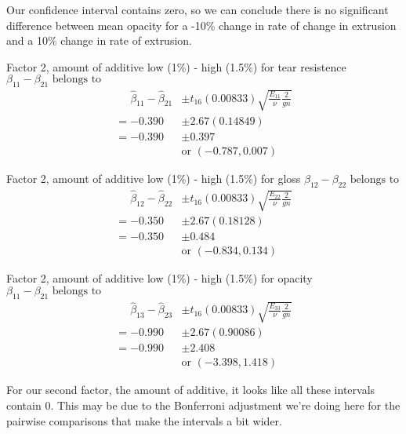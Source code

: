 \begin{enumerate}[label= (\alph*)]
    Our confidence interval contains zero, so we can conclude there is no significant difference between mean opacity for a -10\% change in rate of change in extrusion and a 10\% change in rate of extrusion.


    Factor 2, amount of additive low (1\%) - high (1.5\%) for tear resistence \newline
    $\beta_{11} - \beta_{21}\text{ belongs to}$
    \begin{align*}
        \phantom{=}
        \hat{\beta}_{11} - \hat{\beta}_{21}
        & \pm
        t_{16}(0.00833)
        \sqrt{\frac{E_{11}}{\nu}\frac{2}{gn}}
        \\
        =
        -0.390
        & \pm
        2.67(0.14849)
        \\
        =
        -0.390
        & \pm
        0.397
        \\
        \phantom{\pm 0.590}
        &
        \text{or }
        (-0.787, 0.007)
    \end{align*}
    
    Factor 2, amount of additive low (1\%) - high (1.5\%) for gloss \newline
    $\beta_{12} - \beta_{22}\text{ belongs to}$
    \begin{align*}
        \phantom{=}
        \hat{\beta}_{12} - \hat{\beta}_{22}
        & \pm
        t_{16}(0.00833)
        \sqrt{\frac{E_{22}}{\nu}\frac{2}{gn}}
        \\
        =
        -0.350
        & \pm
        2.67(0.18128)
        \\
        =
        -0.350
        & \pm
        0.484
        \\
        \phantom{\pm 0.590}
        &
        \text{or }
        (-0.834, 0.134)
    \end{align*}
    
    Factor 2, amount of additive low (1\%) - high (1.5\%) for opacity \newline
    $\beta_{11} - \beta_{21}\text{ belongs to}$
    \begin{align*}
        \phantom{=}
        \hat{\beta}_{13} - \hat{\beta}_{23}
        & \pm
        t_{16}(0.00833)
        \sqrt{\frac{E_{33}}{\nu}\frac{2}{gn}}
        \\
        =
        -0.990
        & \pm
        2.67(0.90086)
        \\
        =
        -0.990
        & \pm
        2.408
        \\
        \phantom{\pm 0.590}
        &
        \text{or }
        (-3.398, 1.418)
    \end{align*}

    For our second factor, the amount of additive, it looks like all these intervals contain 0. This may be due to the Bonferroni adjustment we're doing here for the pairwise comparisons that make the intervals a bit wider.


\end{enumerate}
